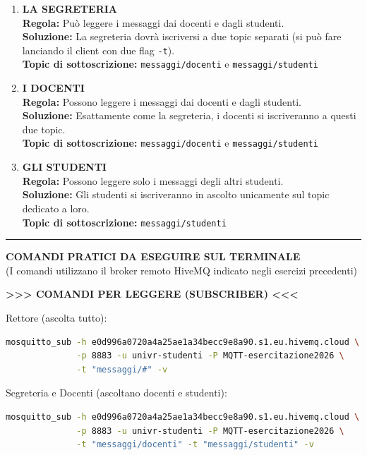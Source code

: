 \documentclass[11pt]{article}
\begin{document}
\begin{tcolorbox}[colback=green!5!white,colframe=green!75!black,title=\textbf{RISPOSTA}, breakable]
\begin{enumerate}
    \item \textbf{LA SEGRETERIA}\\
    \textbf{Regola:} Può leggere i messaggi dai docenti e dagli studenti.\\
    \textbf{Soluzione:} La segreteria dovrà iscriversi a due topic separati (si può fare lanciando il client con due flag \texttt{-t}).\\
    \textbf{Topic di sottoscrizione:} \texttt{messaggi/docenti} e \texttt{messaggi/studenti}

    \item \textbf{I DOCENTI}\\
    \textbf{Regola:} Possono leggere i messaggi dai docenti e dagli studenti.\\
    \textbf{Soluzione:} Esattamente come la segreteria, i docenti si iscriveranno a questi due topic.\\
    \textbf{Topic di sottoscrizione:} \texttt{messaggi/docenti} e \texttt{messaggi/studenti}

    \item \textbf{GLI STUDENTI}\\
    \textbf{Regola:} Possono leggere solo i messaggi degli altri studenti.\\
    \textbf{Soluzione:} Gli studenti si iscriveranno in ascolto unicamente sul topic dedicato a loro.\\
    \textbf{Topic di sottoscrizione:} \texttt{messaggi/studenti}
\end{enumerate}

\noindent\rule{\textwidth}{0.4pt}
\textbf{COMANDI PRATICI DA ESEGUIRE SUL TERMINALE}\\
(I comandi utilizzano il broker remoto HiveMQ indicato negli esercizi precedenti)

\textbf{>>> COMANDI PER LEGGERE (SUBSCRIBER) <<<}

Rettore (ascolta tutto):
\begin{lstlisting}[language=bash, basicstyle=\ttfamily\small]
mosquitto_sub -h e0d996a0720a4a25ae1a34becc9e8a90.s1.eu.hivemq.cloud \
              -p 8883 -u univr-studenti -P MQTT-esercitazione2026 \
              -t "messaggi/#" -v
\end{lstlisting}

Segreteria e Docenti (ascoltano docenti e studenti):
\begin{lstlisting}[language=bash, basicstyle=\ttfamily\small]
mosquitto_sub -h e0d996a0720a4a25ae1a34becc9e8a90.s1.eu.hivemq.cloud \
              -p 8883 -u univr-studenti -P MQTT-esercitazione2026 \
              -t "messaggi/docenti" -t "messaggi/studenti" -v
\end{lstlisting}


\end{tcolorbox}
\end{document}
